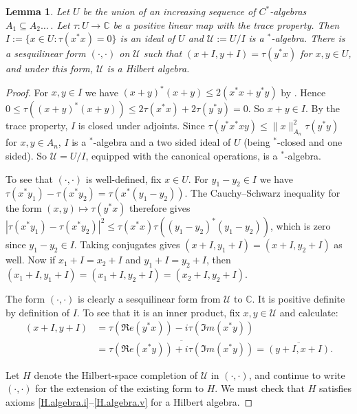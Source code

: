 \documentclass[a4paper, 12pt]{amsart}
\numberwithin{equation}{section}
\newcounter{theorem}
\newtheorem{lemma}[theorem]{Lemma}
\theoremstyle{remark}
\theoremstyle{definition}
\begin{document}
\begin{lemma}\label{lem.hilbert.alg}
Let $U$ be the union of an increasing sequence of $C^*$-algebras $A_1\subseteq
A_2\dots\,$. Let $\tau\colon U\to {\mathbb{C}}$ be a positive linear map with the trace property.
Then $I:=\{x\in U : \tau(x^*x)=0\}$ is an ideal of $U$ and ${\mathcal{U}} := U/I$ is a
$^*$-algebra. There is a sesquilinear form $(\cdot, \cdot)$ on ${\mathcal{U}}$ such that $(x+I,y+I)
= \tau(y^*x)$ for $x,y\in U$, and under this form, ${\mathcal{U}}$ is a Hilbert algebra.
\end{lemma}
\begin{proof}
For $x,y\in I$ we have $(x+y)^*(x+y)\leq 2(x^*x+y^*y)$ by \cite[II.3.1.9]{MR2188261}.
Hence $0\leq \tau((x+y)^*(x+y))\leq 2\tau(x^*x)+2\tau(y^*y)=0$. So $x+y\in I$. By the
trace property, $I$ is closed under adjoints. Since
$\tau(y^*x^*xy)\leq\|x\|_{A_n}^2\tau(y^*y)$ for $x,y\in A_n$, $I$ is a $^*$-algebra and a
two sided ideal of $U$ (being $^*$-closed and one sided). So ${\mathcal{U}}=U/I$, equipped with the
canonical operations, is a $^*$-algebra.

To see that $(\cdot, \cdot)$ is well-defined, fix $x\in U$. For $y_1-y_2\in I$ we have
$\tau(x^*y_1) - \tau(x^*y_2) = \tau(x^*(y_1 - y_2))$. The Cauchy--Schwarz inequality for
the form $(x,y) \mapsto \tau(y^*x)$ therefore gives $|\tau(x^*y_1) - \tau(x^*y_2)|^2 \le
\tau(x^*x)\tau((y_1-y_2)^*(y_1-y_2))$, which is zero since $y_1 - y_2 \in I$. Taking
conjugates gives $(x+I, y_1+I)=(x+I, y_2+I)$ as well. Now if $x_1 + I = x_2 + I$ and $y_1
+ I = y_2 + I$, then $(x_1+I, y_1+I) = (x_1+I, y_2+I) = (x_2+I, y_2+I)$.

The form $(\cdot, \cdot)$ is clearly a sesquilinear form from ${\mathcal{U}}$ to ${\mathbb{C}}$. It is
positive definite by definition of $I$. To see that it is an inner product, fix $x,y
\in {\mathcal{U}}$ and calculate:
\begin{align*}
(x+I,y+I)
    &=\tau(\Re{e}(y^*x))-i\tau(\Im{m}(x^*y))\\
    &=\overline{\tau(\Re{e}(x^*y))+i\tau(\Im{m}(x^*y))}
    =\overline{(y+I,x+I)}.
\end{align*}

Let $H$ denote the Hilbert-space completion of ${\mathcal{U}}$ in $(\cdot, \cdot)$, and continue to
write $(\cdot, \cdot)$ for the extension of the existing form to $H$. We must check that
$H$ satisfies axioms \eqref{H.algebra.i}--\eqref{H.algebra.v} for a Hilbert algebra.


\end{proof}
\end{document}
